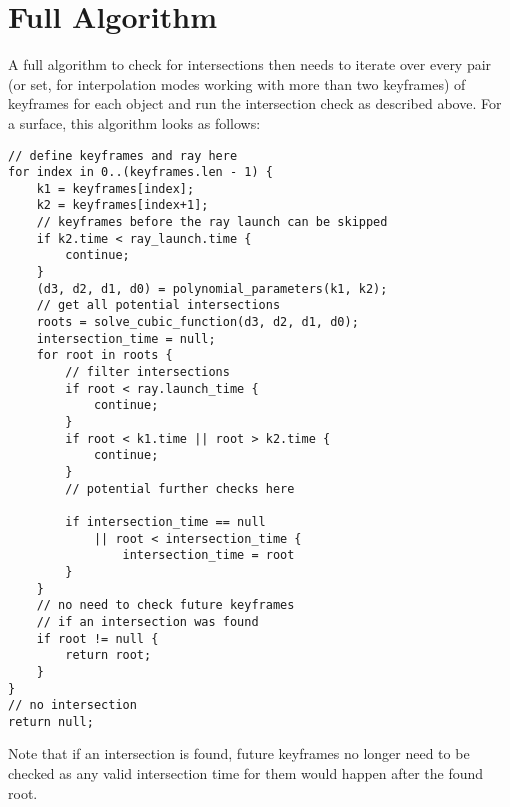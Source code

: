 \section{Full Algorithm}

A full algorithm to check for intersections then needs to iterate over every pair
(or set, for interpolation modes working with more than two keyframes) of keyframes for each object
and run the intersection check as described above.
\newline
For a surface, this algorithm looks as follows:

\begin{verbatim}
// define keyframes and ray here
for index in 0..(keyframes.len - 1) {
    k1 = keyframes[index];
    k2 = keyframes[index+1];
    // keyframes before the ray launch can be skipped
    if k2.time < ray_launch.time {
        continue;
    }
    (d3, d2, d1, d0) = polynomial_parameters(k1, k2);
    // get all potential intersections
    roots = solve_cubic_function(d3, d2, d1, d0);
    intersection_time = null;
    for root in roots {
        // filter intersections
        if root < ray.launch_time {
            continue;
        }
        if root < k1.time || root > k2.time {
            continue;
        }
        // potential further checks here

        if intersection_time == null
            || root < intersection_time {
                intersection_time = root
        }
    }
    // no need to check future keyframes
    // if an intersection was found
    if root != null {
        return root;
    }
}
// no intersection
return null;
\end{verbatim}

Note that if an intersection is found,
future keyframes no longer need to be checked as any valid intersection time for them would happen after the found root.